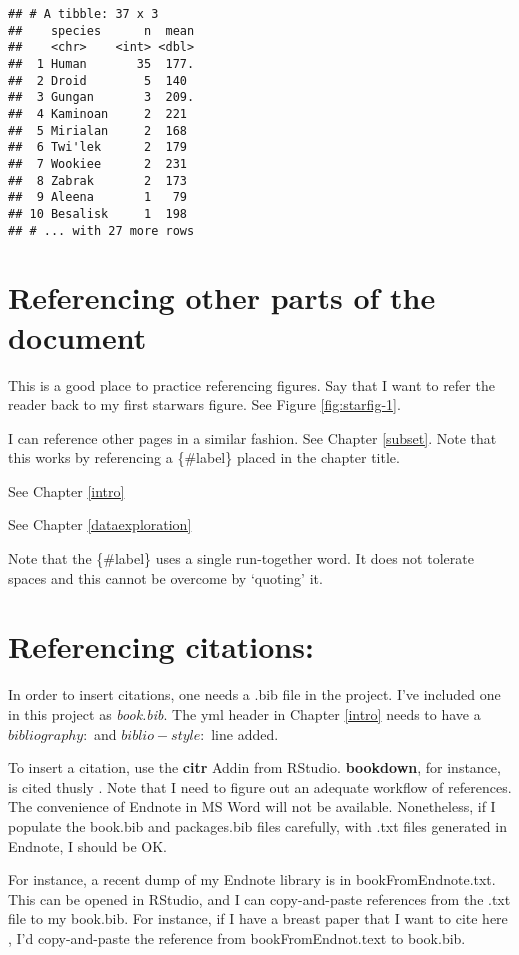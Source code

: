 \documentclass[]{book}
\begin{document}
\begin{verbatim}
## # A tibble: 37 x 3
##    species      n  mean
##    <chr>    <int> <dbl>
##  1 Human       35  177.
##  2 Droid        5  140 
##  3 Gungan       3  209.
##  4 Kaminoan     2  221 
##  5 Mirialan     2  168 
##  6 Twi'lek      2  179 
##  7 Wookiee      2  231 
##  8 Zabrak       2  173 
##  9 Aleena       1   79 
## 10 Besalisk     1  198 
## # ... with 27 more rows
\end{verbatim}

\hypertarget{referencing-other-parts-of-the-document}{%
\section{Referencing other parts of the document}\label{referencing-other-parts-of-the-document}}

This is a good place to practice referencing figures. Say that I want to refer the reader back to my first starwars figure. See Figure \ref{fig:starfig-1}.

I can reference other pages in a similar fashion. See Chapter \ref{subset}. Note that this works by referencing a \{\#label\} placed in the chapter title.

See Chapter \ref{intro}

See Chapter \ref{dataexploration}

Note that the \{\#label\} uses a single run-together word. It does not tolerate spaces and this cannot be overcome by `quoting' it.

\hypertarget{referencing-citations}{%
\section{Referencing citations:}\label{referencing-citations}}

In order to insert citations, one needs a .bib file in the project. I've included one in this project as \emph{book.bib}. The yml header in Chapter \ref{intro} needs to have a \(bibliography:\) and \(biblio-style:\) line added.

To insert a citation, use the \textbf{citr} Addin from RStudio. \textbf{bookdown}, for instance, is cited thusly \citep{R-bookdown}. Note that I need to figure out an adequate workflow of references. The convenience of Endnote in MS Word will not be available. Nonetheless, if I populate the book.bib and packages.bib files carefully, with .txt files generated in Endnote, I should be OK.

For instance, a recent dump of my Endnote library is in bookFromEndnote.txt. This can be opened in RStudio, and I can copy-and-paste references from the .txt file to my book.bib. For instance, if I have a breast paper that I want to cite here \citep{RN2750}, I'd copy-and-paste the reference from bookFromEndnot.text to book.bib.
\end{document}
